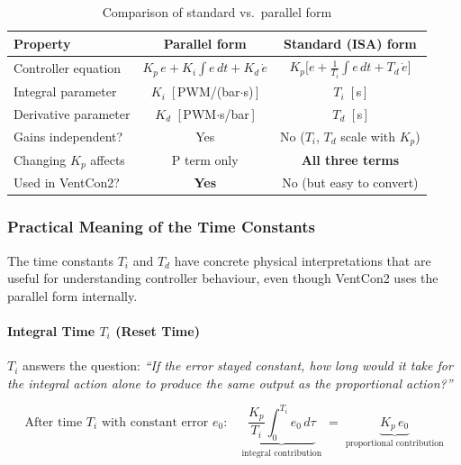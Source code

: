 \begin{table}[H]
\centering
\caption{Comparison of standard vs.\ parallel form}
\label{tab:form-comparison}
\begin{tabular}{lcc}
\toprule
\textbf{Property} & \textbf{Parallel form} & \textbf{Standard (ISA) form} \\
\midrule
Controller equation     & $K_p\,e + K_i\!\int e\,dt + K_d\,\dot{e}$ & $K_p\bigl[e + \tfrac{1}{T_i}\!\int e\,dt + T_d\,\dot{e}\bigr]$ \\
Integral parameter      & $K_i$ \,[\,PWM/(bar$\cdot$s)\,] & $T_i$ \,[\,s\,] \\
Derivative parameter    & $K_d$ \,[\,PWM$\cdot$s/bar\,] & $T_d$ \,[\,s\,] \\
Gains independent?      & Yes & No ($T_i$, $T_d$ scale with $K_p$) \\
Changing $K_p$ affects   & P term only & \textbf{All three terms} \\
Used in VentCon2?       & \textbf{Yes} & No (but easy to convert) \\
\bottomrule
\end{tabular}
\end{table}

\subsubsection{Practical Meaning of the Time Constants}
\label{sec:time-constants-practical}

The time constants $T_i$ and $T_d$ have concrete physical interpretations that are useful for understanding controller behaviour, even though VentCon2 uses the parallel form internally.

\paragraph{Integral Time $T_i$ (Reset Time)}

$T_i$ answers the question: \emph{``If the error stayed constant, how long would it take for the integral action alone to produce the same output as the proportional action?''}

\begin{equation}
    \text{After time } T_i \text{ with constant error } e_0: \quad
    \underbrace{\frac{K_p}{T_i}\!\int_0^{T_i} e_0 \, d\tau}_{\text{integral contribution}} \;=\;
    \underbrace{K_p \, e_0}_{\text{proportional contribution}}
\end{equation}

